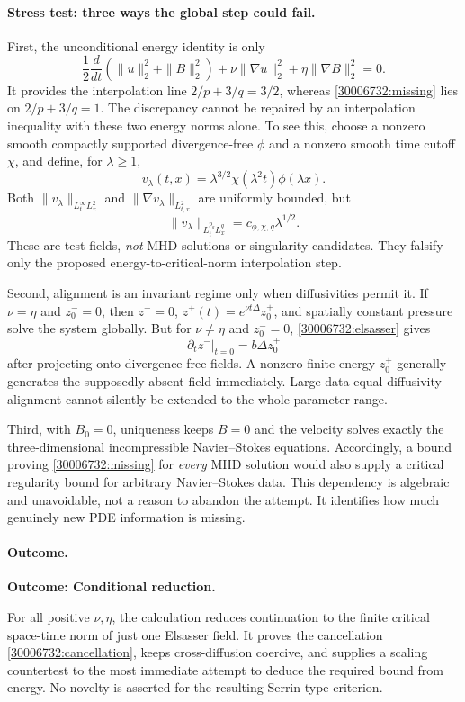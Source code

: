 \documentclass[11pt,a4paper]{article}
\numberwithin{equation}{section}
\begin{document}
\paragraph{Stress test: three ways the global step could fail.}
First, the unconditional energy identity is only
\[
 \frac12\frac d{dt}(\|u\|_2^2+\|B\|_2^2)
 +\nu\|\nabla u\|_2^2+\eta\|\nabla B\|_2^2=0.
\]
It provides the interpolation line $2/p+3/q=3/2$, whereas
\eqref{30006732:missing} lies on $2/p+3/q=1$.
The discrepancy cannot be repaired by an interpolation inequality with
these two energy norms alone. To see this, choose a nonzero smooth compactly
supported divergence-free $\phi$ and a nonzero smooth time cutoff $\chi$,
and define, for $\lambda\geq1$,
\[
 v_\lambda(t,x)=\lambda^{3/2}\chi(\lambda^2t)\phi(\lambda x).
\]
Both $\|v_\lambda\|_{L^\infty_tL^2_x}$ and
$\|\nabla v_\lambda\|_{L^2_{t,x}}$ are uniformly bounded, but
\[
 \|v_\lambda\|_{L^{p_q}_tL^q_x}
 =c_{\phi,\chi,q}\lambda^{1/2}.
\]
These are test fields, \emph{not} MHD solutions or singularity candidates.
They falsify only the proposed energy-to-critical-norm interpolation step.

Second, alignment is an invariant regime only when diffusivities permit it.
If $\nu=\eta$ and $z^-_0=0$, then
$z^-=0$, $z^+(t)=e^{\nu t\Delta}z^+_0$, and spatially constant pressure
solve the system globally. But for $\nu\ne\eta$ and $z^-_0=0$,
\eqref{30006732:elsasser} gives
\[
 \partial_tz^-\big|_{t=0}=b\Delta z^+_0
\]
after projecting onto divergence-free fields. A nonzero finite-energy
$z^+_0$ generally generates the supposedly absent field immediately.
Large-data equal-diffusivity alignment cannot silently be extended to the
whole parameter range.

Third, with $B_0=0$, uniqueness keeps $B=0$ and the velocity solves exactly
the three-dimensional incompressible Navier--Stokes equations. Accordingly,
a bound proving \eqref{30006732:missing} for \emph{every} MHD solution would also
supply a critical regularity bound for arbitrary Navier--Stokes data.
This dependency is algebraic and unavoidable, not a reason to abandon the
attempt. It identifies how much genuinely new PDE information is missing.

\paragraph{Outcome.}
\textbf{Outcome: Conditional reduction.}

For all positive $\nu,\eta$, the calculation reduces continuation to the
finite critical space-time norm of just one Elsasser field. It proves the
cancellation \eqref{30006732:cancellation}, keeps cross-diffusion coercive,
and supplies a scaling countertest to the most immediate attempt to deduce
the required bound from energy. No novelty is asserted for the resulting
Serrin-type criterion.
\end{document}
